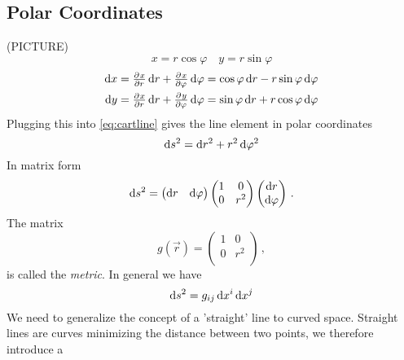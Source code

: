 \subsection*{Polar Coordinates}
(PICTURE)
\begin{equation*}
    x= r\cos\varphi\quad y= r\sin\varphi
\end{equation*}
\begin{align*}
    \dif x&= \pd{x}{r}\dif r+\pd{x}{\varphi}\dif \varphi = \cos\varphi\dif r-r\sin\varphi\dif \varphi\\
    \dif y&= \pd{x}{r}\dif r+\pd{y}{\varphi}\dif \varphi = \sin\varphi\dif r+r\cos\varphi\dif \varphi
\end{align*}
Plugging this into \eqref{eq:cartline} gives the line element in polar coordinates
\begin{equation}
    \dif s^2=\dif r^2+r^2\dif \varphi^2
\end{equation}
In matrix form
\begin{equation}
    \dif s^2=
    \begin{pmatrix}
        \dif r& \dif \varphi
    \end{pmatrix}
    \begin{pmatrix}
        1& 0\\
        0& r^2\\
    \end{pmatrix}
    \begin{pmatrix}
        \dif r\\ \dif \varphi
    \end{pmatrix}\, .
\end{equation}
The matrix
\begin{equation}
    g(\vec{r})=
    \begin{pmatrix}
        1& 0\\
        0& r^2\\
    \end{pmatrix}\, ,
\end{equation}
is called the \emph{metric}.
In general we have
\begin{equation}
    \dif s^2 = g_{ij}\dif x^i\dif x^j
\end{equation}
We need to generalize the concept of a 'straight' line to curved space. Straight lines are curves minimizing the distance between two points, 
we therefore introduce a
